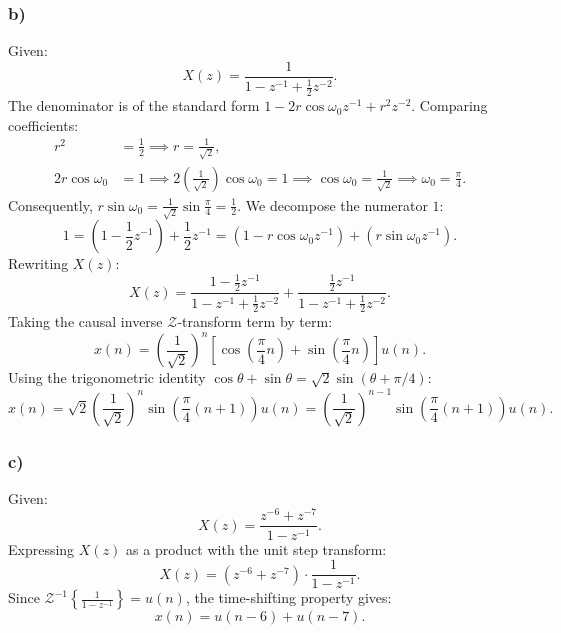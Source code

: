 \documentclass[12pt,a4paper]{article}
\begin{document}
\subsubsection*{b)}
Given:
\begin{equation}
    X(z) = \frac{1}{1 - z^{-1} + \frac{1}{2}z^{-2}}.
\end{equation}
The denominator is of the standard form $1 - 2r \cos\omega_0 z^{-1} + r^2 z^{-2}$. Comparing coefficients:
\begin{align*}
    r^2 &= \frac{1}{2} \implies r = \frac{1}{\sqrt{2}}, \\
    2r \cos\omega_0 &= 1 \implies 2\left(\frac{1}{\sqrt{2}}\right)\cos\omega_0 = 1 \implies \cos\omega_0 = \frac{1}{\sqrt{2}} \implies \omega_0 = \frac{\pi}{4}.
\end{align*}
Consequently, $r \sin\omega_0 = \frac{1}{\sqrt{2}} \sin\frac{\pi}{4} = \frac{1}{2}$. We decompose the numerator $1$:
\begin{equation}
    1 = \left( 1 - \frac{1}{2}z^{-1} \right) + \frac{1}{2}z^{-1} = \left( 1 - r \cos\omega_0 z^{-1} \right) + \left( r \sin\omega_0 z^{-1} \right).
\end{equation}
Rewriting $X(z)$:
\begin{equation}
    X(z) = \frac{1 - \frac{1}{2}z^{-1}}{1 - z^{-1} + \frac{1}{2}z^{-2}} + \frac{\frac{1}{2}z^{-1}}{1 - z^{-1} + \frac{1}{2}z^{-2}}.
\end{equation}
Taking the causal inverse $\mathcal{Z}$-transform term by term:
\begin{equation}
    x(n) = \left(\frac{1}{\sqrt{2}}\right)^n \left[ \cos\left(\frac{\pi}{4} n\right) + \sin\left(\frac{\pi}{4} n\right) \right] u(n).
\end{equation}
Using the trigonometric identity $\cos\theta + \sin\theta = \sqrt{2} \sin(\theta + \pi/4)$:
\begin{equation}
    x(n) = \sqrt{2}\left(\frac{1}{\sqrt{2}}\right)^n \sin\left(\frac{\pi}{4}(n+1)\right) u(n) = \left(\frac{1}{\sqrt{2}}\right)^{n-1} \sin\left(\frac{\pi}{4}(n+1)\right) u(n).
\end{equation}

\subsubsection*{c)}
Given:
\begin{equation}
    X(z) = \frac{z^{-6} + z^{-7}}{1 - z^{-1}}.
\end{equation}
Expressing $X(z)$ as a product with the unit step transform:
\begin{equation}
    X(z) = (z^{-6} + z^{-7}) \cdot \frac{1}{1 - z^{-1}}.
\end{equation}
Since $\mathcal{Z}^{-1}\left\{ \frac{1}{1 - z^{-1}} \right\} = u(n)$, the time-shifting property gives:
\begin{equation}
    x(n) = u(n - 6) + u(n - 7).
\end{equation}
\end{document}
